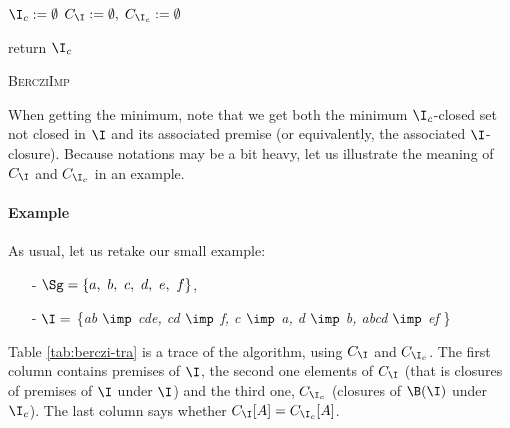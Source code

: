 \begin{algorithm}
	
	\BlankLine
	\BlankLine
	
	$\I_c := \emptyset$ \;
	$C_{\I} := \emptyset, \; C_{\I_c} := \emptyset $ \;
	

	\BlankLine
	

	\BlankLine
	
	return $\I_c$ \;
	
	\caption{\textsc{BercziImp}}
	\label{alg:Berczi-imp}
\end{algorithm}

When getting the minimum, note that we get both the minimum $\I_c$-closed set not closed in $\I$ and its associated premise (or equivalently, the associated $\I$-closure). Because notations may be a bit heavy, let us illustrate the meaning of $C_{\I}$ and $C_{\I_c}$ in an example.


\paragraph{Example} As usual, let us retake our small example:
\begin{itemize}
	\item[-] $\Sg = \{a, \ b, \ c, \ d, \ e, \ f \}$,
	\item[-] $\I =$ \{\textit{ab $\imp$ cde, cd $\imp$ f, c $\imp$ a, d $\imp$ b, abcd $\imp$ ef} \} 
\end{itemize}
\noindent Table \ref{tab:berczi-tra} is a trace of the algorithm, using $C_{\I}$ and $C_{\I_c}$. The first column contains premises of $\I$, the second one elements of $C_{\I}$ (that is closures of premises of $\I$ under $\I$) and
the third one, $C_{\I_c}$ (closures of $\B(\I)$ under $\I_c$). The last column
says whether $C_{\I}[A] = C_{\I_c}[A]$.

